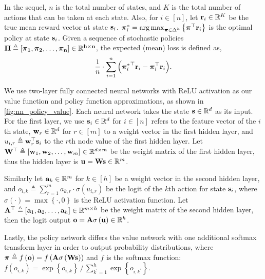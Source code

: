 In the sequel, $n$ is the total number of states, and $K$ is the total number of actions that can be taken at each state.
Also, for $i\in[n]$, let ${\mathbf{r}}_i \in {\mathbb{R}}^K$ be the true mean reward vector at state ${\mathbf{s}}_i$. ${\boldsymbol{\pi}}_i^* = \operatorname*{arg\,max}_{{\boldsymbol{\pi}} \in \Delta^{h}}{\left\{ {\boldsymbol{\pi}}^\top {\mathbf{r}}_i \right\}}$ is the optimal policy at state ${\mathbf{s}}_i$. Given a sequence of  stochastic policies $\bf{\Pi} \triangleq \left[ {\boldsymbol{\pi}}_1, {\boldsymbol{\pi}}_2, \dots, {\boldsymbol{\pi}}_n \right] \in {{\mathbb{R}}}^{h \times n}$, the expected (mean) loss is defined as,
\begin{equation}
\label{eq:expected_loss}
\begin{split}
\frac{1}{n} \cdot \sum\limits_{i=1}^{n}{ \left( {{\boldsymbol{\pi}}_i^*}^\top {\mathbf{r}}_i - {\boldsymbol{\pi}}_i^\top {\mathbf{r}}_i \right) }.
\end{split}
\end{equation}

We use two-layer fully connected neural networks with ReLU activation as our value function and policy function approximations, as shown in \cref{fig:nn_policy_value}. 
Each neural network takes the state ${\mathbf{s}} \in {\mathbb{R}}^d$ as its input. 
For the first layer, we use ${\mathbf{s}}_i \in {\mathbb{R}}^d$ for $i \in [n]$ refers to the feature vector of the $i$th state, ${\mathbf{w}}_r \in {\mathbb{R}}^d$ for $r \in [m]$ to a weight vector in the first hidden layer, and $u_{i,r} \triangleq {\mathbf{w}}_r^\top {\mathbf{s}}_i$ to the $r$th node value of the first hidden layer.
Let ${\mathbf{W}}^\top \triangleq \left[ {\mathbf{w}}_1, {\mathbf{w}}_2, \dots, {\mathbf{w}}_m \right] \in {\mathbb{R}}^{d \times m}$ be the weight matrix of the first hidden layer, thus the hidden layer is ${\mathbf{u}} = {\mathbf{W}}{\mathbf{s}}\in{\mathbb{R}}^m$.

Similarly let ${\mathbf{a}}_k \in {\mathbb{R}}^m$ for $k \in [h]$ be a weight vector in the second hidden layer, and $o_{i,k} \triangleq \sum_{r=1}^{m}{a_{k,r} \cdot \sigma\left( u_{i,r} \right)}$ be the logit of the $k$th action for state ${\mathbf{s}}_i$, where $\sigma(\cdot) = \max\left\{ \cdot, 0 \right\}$ is the ReLU activation function. 
Let ${\mathbf{A}}^\top \triangleq \left[ {\mathbf{a}}_1, {\mathbf{a}}_2, \dots, {\mathbf{a}}_h \right] \in {\mathbb{R}}^{m \times h}$ be the weight matrix of the second hidden layer, then the logit output ${\mathbf{o}} = {\mathbf{A}}\sigma\left( {\mathbf{u}}\right) \in {\mathbb{R}}^h$.

Lastly, the policy network differs the value network with one additional softmax transform layer in order to output probability distributions, where ${\boldsymbol{\pi}} \triangleq f\left( {\mathbf{o}} \right) = f\left( {\mathbf{A}} \sigma\left( {\mathbf{W}} {\mathbf{s}} \right) \right)$ and $f$ is the softmax function: $f\left( o_{i,k} \right) = \exp\left\{ o_{i,k} \right\} \,/\, \sum_{k^\prime = 1}^{h}{\exp\left\{ o_{i,k^\prime} \right\}}$.
